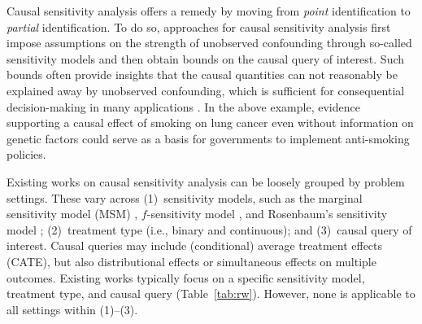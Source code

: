 \documentclass{article} %
\theoremstyle{definition}
\theoremstyle{plain}
\begin{document}
Causal sensitivity analysis offers a remedy by moving from \emph{point} identification to \emph{partial} identification. To do so, approaches for causal sensitivity analysis first impose assumptions on the strength of unobserved confounding through so-called sensitivity models \citep{Rosenbaum.1987, Imbens.2003} and then obtain bounds on the causal query of interest. Such bounds often provide insights that the causal quantities can not reasonably be explained away by unobserved confounding, which is sufficient for consequential decision-making in many applications \citep{Kallus.2019}. In the above example, evidence supporting a causal effect of smoking on lung cancer even without information on genetic factors could serve as a basis for governments to implement anti-smoking policies. 


Existing works on causal sensitivity analysis can be loosely grouped by problem settings. These vary across (1)~sensitivity models, such as the marginal sensitivity model (MSM) \citep{Tan.2006}, $f$-sensitivity model \citep{Jin.2022}, and Rosenbaum's sensitivity model \citep{Rosenbaum.1987}; (2)~treatment type (i.e., binary and continuous); and (3)~causal query of interest. Causal queries may include (conditional) average treatment effects (CATE), but also distributional effects or simultaneous effects on multiple outcomes. Existing works typically focus on a specific sensitivity model, treatment type, and causal query (Table~\ref{tab:rw}). However, none is applicable to all settings within (1)--(3). 


\end{document}
